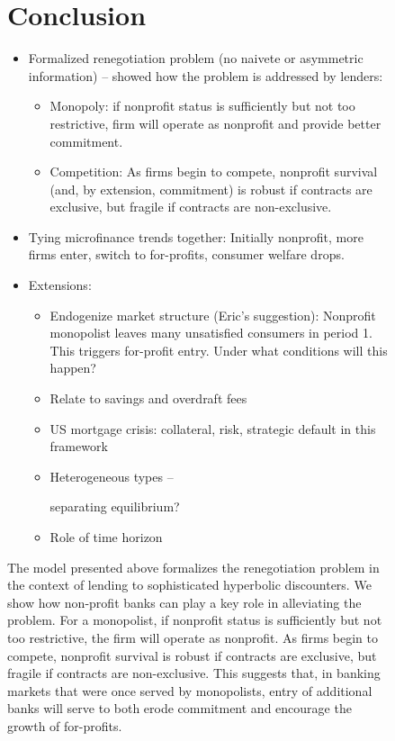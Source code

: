 \documentclass[11pt]{article}%
\begin{document}
\begin{figure}
{\section{Conclusion}

\begin{itemize}
\item Formalized renegotiation problem (no naivete or asymmetric information)
-- showed how the problem is addressed by lenders:

\begin{itemize}
\item Monopoly: if nonprofit status is sufficiently but not too restrictive,
firm will operate as nonprofit and provide better commitment.

\item Competition: As firms begin to compete, nonprofit survival (and, by
extension, commitment) is robust if contracts are exclusive, but fragile if
contracts are non-exclusive.
\end{itemize}

\item Tying microfinance trends together: Initially nonprofit, more firms
enter, switch to for-profits, consumer welfare drops.

\item Extensions:

\begin{itemize}
\item Endogenize market structure (Eric's suggestion): Nonprofit monopolist
leaves many unsatisfied consumers in period 1. This triggers for-profit entry.
Under what conditions will this happen?

\item Relate to savings and overdraft fees

\item US mortgage crisis: collateral, risk, strategic default in this framework

\item Heterogeneous types --%

separating equilibrium?

\item Role of time horizon
\end{itemize}
\end{itemize}

\bigskip

The model presented above formalizes the renegotiation problem in the context
of lending to sophisticated hyperbolic discounters. We show how non-profit
banks can play a key role in alleviating the problem. For a monopolist, if
nonprofit status is sufficiently but not too restrictive, the firm will
operate as nonprofit. As firms begin to compete, nonprofit survival is robust
if contracts are exclusive, but fragile if contracts are non-exclusive. This
suggests that, in banking markets that were once served by monopolists, entry
of additional banks will serve to both erode commitment and encourage the
growth of for-profits.

}
\end{figure}
\end{document}
